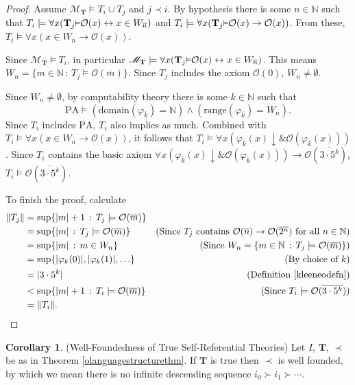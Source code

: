 \documentclass[reqno]{article}
\theoremstyle{definition}
\newtheorem{corollary}[theorem]{Corollary}
\def\N{\mathbb{N}}
\def\M{\mathscr{M}}
\def\T{\mathbf{T}}
\def\O{\mathcal{O}}
\renewcommand{\Pr}[1]{\T_{#1}\mbox{\small${\vDash}$}}
\begin{document}
\begin{proof}
Assume $\M_\T\models T_i\cup T_j$ and $j\prec i$.
By hypothesis
there is some $n\in\N$ such that $T_i\models\forall x(\Pr j\O(x)\leftrightarrow x\in W_{\overline n})$
and $T_i\models\forall x(\Pr j\O(x)\rightarrow\O(x))$.
From these, $T_i\models\forall x(x\in W_{\overline n}\rightarrow \O(x))$.

Since $\M_\T\models T_i$,
in particular $\M_\T\models \forall x(\Pr j\O(x)\leftrightarrow x\in W_{\overline n})$.
This means $W_n=\{m\in\N\,:\,T_j\models\O(\overline m)\}$.
Since $T_j$ includes the axiom $\O(0)$,
$W_n\not=\emptyset$.

Since $W_n\not=\emptyset$,
by computability theory
there is some $k\in\N$ such that
\[
\mathrm{PA} \models (\mathrm{domain}(\varphi_{\overline k})=\N)\wedge (\mathrm{range}(\varphi_{\overline k})=W_{\overline n}). 
\]
Since $T_i$ includes $\mathrm{PA}$,
$T_i$ also implies as much.
Combined with
$T_i\models\forall x(x\in W_{\overline n}\rightarrow\O(x))$,
it follows that
$T_i\models
\forall x(\varphi_{\overline{k}}(x){\downarrow} \mathrel{\&} \O(\varphi_{\overline{k}}(x)))$.
Since $T_i$ contains
the basic axiom
$\forall x(\varphi_{\overline k}(x){\downarrow}
\mathrel\& \O(\varphi_{\overline k}(x)))\rightarrow\O(\overline{3\cdot 5^k})$,
$T_i\models \O(\overline{3\cdot 5^k})$.

To finish the proof, calculate
\begin{align*}
\|T_j\|
&=
\sup\{|m|+1\,:\,T_j\models\O(\overline m)\}\\
&=
\sup\{|m|\,:\,T_j\models\O(\overline m)\}
  &\mbox{(Since $T_j$ contains $\O(\overline n)\rightarrow\O(\overline{2^n})$ for all $n\in\N$)}\\
&=
\sup\{|m|\,:\,m\in W_n\}
  &\mbox{(Since $W_n=\{m\in\N\,:\,T_j\models \O(\overline m)\}$)}\\
&=
\sup\{|\varphi_k(0)|,|\varphi_k(1)|,\ldots\}
  &\mbox{(By choice of $k$)}\\
&=
|3\cdot 5^k|
  &\mbox{(Definition \ref{kleeneodefn})}\\
&<
\sup\{|m|+1\,:\,T_i\models \O(\overline m)\}
  &\mbox{(Since $T_i\models \O(\overline{3\cdot 5^k})$)}\\
&=
\|T_i\|.
\end{align*}
\end{proof}


\begin{corollary}
\label{olanguagewellfounded}
(Well-Foundedness of True Self-Referential Theories)
Let $I$, $\T$, $\prec$ be as in Theorem \ref{olanguagestructurethm}.
If $\T$ is true then $\prec$ is well founded,
by which we mean there is no infinite descending sequence
$i_0\succ i_1\succ\cdots$.
\end{corollary}
\end{document}

